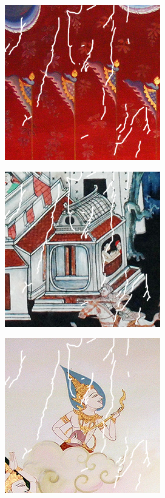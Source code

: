 \documentclass[xcolor=dvipsnames, xetex,serif]{beamer}
\numberwithin{equation}{section}
\begin{document}
\begin{frame}
\begin{figure}[H]
\begin{subfigure}{0.3\linewidth}
                \centering
                \includegraphics[width=0.7\linewidth]{images/thaiart/case03-toinpaint.png}			
            \end{subfigure}
            \begin{subfigure}{0.3\linewidth}
                \centering
                \includegraphics[width=0.7\linewidth]{images/thaiart/case04-toinpaint.png}			
            \end{subfigure}
            \begin{subfigure}{0.3\linewidth}
                \centering
                \includegraphics[width=0.7\linewidth]{images/thaiart/case05-toinpaint.png}			

\end{subfigure}
\end{figure}
\end{frame}
\end{document}
